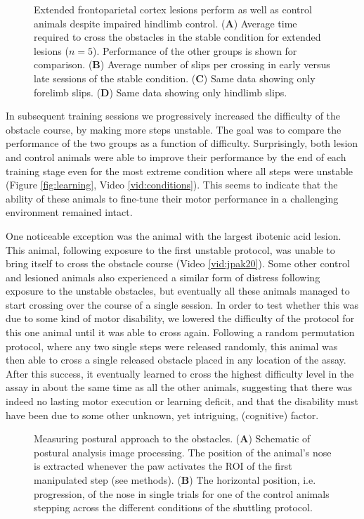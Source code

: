 \begin{figure}
\centering

\caption{Extended frontoparietal cortex lesions perform as well as control animals despite impaired hindlimb control. (\textbf{A}) Average time required to cross the obstacles in the stable condition for extended lesions ($n = 5$). Performance of the other groups is shown for comparison. (\textbf{B}) Average number of slips per crossing in early versus late sessions of the stable condition. (\textbf{C}) Same data showing only forelimb slips. (\textbf{D}) Same data showing only hindlimb slips.}
\label{fig:extendedPerformance}
\end{figure}

In subsequent training sessions we progressively increased the difficulty of the obstacle course, by making more steps unstable. The goal was to compare the performance of the two groups as a function of difficulty. Surprisingly, both lesion and control animals were able to improve their performance by the end of each training stage even for the most extreme condition where all steps were unstable (Figure \ref{fig:learning}, Video \ref{vid:conditions}). This seems to indicate that the ability of these animals to fine-tune their motor performance in a challenging environment remained intact.

One noticeable exception was the animal with the largest ibotenic acid lesion. This animal, following exposure to the first unstable protocol, was unable to bring itself to cross the obstacle course (Video \ref{vid:jpak20}). Some other control and lesioned animals also experienced a similar form of distress following exposure to the unstable obstacles, but eventually all these animals managed to start crossing over the course of a single session. In order to test whether this was due to some kind of motor disability, we lowered the difficulty of the protocol for this one animal until it was able to cross again. Following a random permutation protocol, where any two single steps were released randomly, this animal was then able to cross a single released obstacle placed in any location of the assay. After this success, it eventually learned to cross the highest difficulty level in the assay in about the same time as all the other animals, suggesting that there was indeed no lasting motor execution or learning deficit, and that the disability must have been due to some other unknown, yet intriguing, (cognitive) factor.

\begin{figure}
\centering

\caption{Measuring postural approach to the obstacles. (\textbf{A}) Schematic of postural analysis image processing. The position of the animal's nose is extracted whenever the paw activates the ROI of the first manipulated step (see methods). (\textbf{B}) The horizontal position, i.e. progression, of the nose in single trials for one of the control animals stepping across the different conditions of the shuttling protocol.}
\label{fig:postureExample}
\end{figure}

